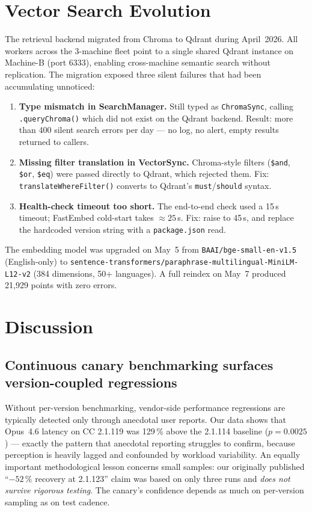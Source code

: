 \documentclass[11pt,a4paper]{article}
\begin{document}
\section{Vector Search Evolution}
\label{sec:vector}

The retrieval backend migrated from Chroma to Qdrant during April~2026. All
workers across the 3-machine fleet point to a single shared Qdrant instance on
Machine-B (port 6333), enabling cross-machine semantic search without
replication. The migration exposed three silent failures that had been
accumulating unnoticed:

\begin{enumerate}[leftmargin=*]
  \item \textbf{Type mismatch in SearchManager.} Still typed as
        \texttt{ChromaSync}, calling \texttt{.queryChroma()} which did not
        exist on the Qdrant backend. Result: more than 400 silent search errors
        per day --- no log, no alert, empty results returned to callers.
  \item \textbf{Missing filter translation in VectorSync.} Chroma-style
        filters (\texttt{\$and}, \texttt{\$or}, \texttt{\$eq}) were passed
        directly to Qdrant, which rejected them. Fix:
        \texttt{translateWhereFilter()} converts to Qdrant's
        \texttt{must}/\texttt{should} syntax.
  \item \textbf{Health-check timeout too short.} The end-to-end check used a
        15\,s timeout; FastEmbed cold-start takes $\approx 25$\,s. Fix:
        raise to 45\,s, and replace the hardcoded version string with a
        \texttt{package.json} read.
\end{enumerate}

The embedding model was upgraded on May~5 from \texttt{BAAI/bge-small-en-v1.5}
(English-only) to \texttt{sentence-transformers/paraphrase-multilingual-MiniLM-L12-v2}
(384 dimensions, 50+ languages). A full reindex on May~7 produced
21{,}929 points with zero errors.

\section{Discussion}

\subsection{Continuous canary benchmarking surfaces version-coupled regressions}

Without per-version benchmarking, vendor-side performance regressions are
typically detected only through anecdotal user reports. Our data shows that
Opus~4.6 latency on CC 2.1.119 was 129\,\% above the 2.1.114 baseline
($p = 0.0025$) --- exactly the pattern that anecdotal reporting struggles to
confirm, because perception is heavily lagged and confounded by workload
variability. An equally important methodological lesson concerns small samples:
our originally published ``$-52\,\%$ recovery at 2.1.123'' claim was based on
only three runs and \emph{does not survive rigorous testing}. The canary's
confidence depends as much on per-version sampling as on test cadence.
\end{document}

